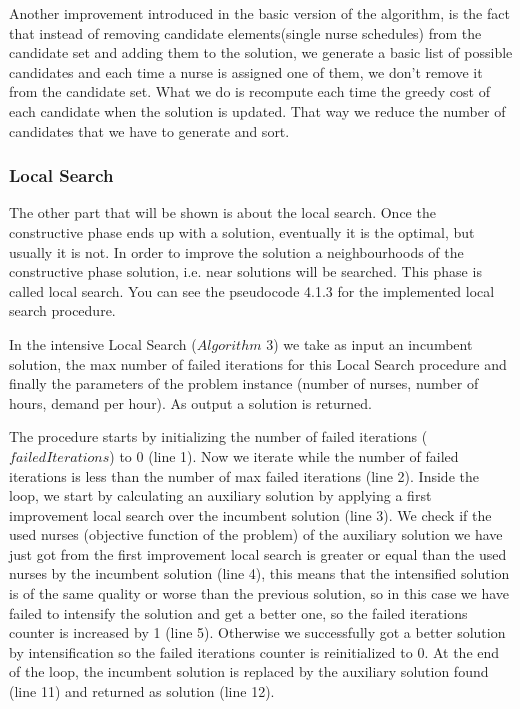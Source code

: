 Another improvement introduced in the basic version of the algorithm, is the fact that instead of removing candidate elements(single nurse schedules) from the candidate set and adding them to the solution, we generate a basic list of possible candidates and each time a nurse is assigned one of them, we don't remove it from the candidate set. What we do is recompute each time the greedy cost of each candidate when the solution is updated. That way we reduce the number of candidates that we have to generate and sort.



\subsubsection{Local Search}

The other part that will be shown is about the local search. Once the constructive phase ends up with a solution, eventually it is the optimal, but usually it is not. In order to improve the solution a neighbourhoods of the constructive phase solution, i.e. near solutions will be searched. This phase is called local search. You can see the pseudocode 4.1.3 for the implemented local search procedure.

In the intensive Local Search ($Algorithm$ $3$) we take as input an incumbent solution, the max number of failed iterations for this Local Search procedure and finally the parameters of the problem instance (number of nurses, number of hours, demand per hour). As output a solution is returned.

The procedure starts by initializing the number of failed iterations ($failedIterations$) to 0 (line 1). Now we iterate while the number of failed iterations is less than the number of max failed iterations (line 2). Inside the loop, we start by calculating an auxiliary solution by applying a first improvement local search over the incumbent solution (line 3). We check if the used nurses (objective function of the problem) of the auxiliary solution we have just got from the first improvement local search is greater or equal than the  used nurses by the incumbent solution (line 4), this means that the intensified solution is of the same quality or worse than the previous solution, so in this case we have failed to intensify the solution and get a better one, so the failed iterations counter is increased by 1 (line 5). Otherwise we successfully got a better solution by intensification so the failed iterations counter is reinitialized to 0. At the end of the loop, the incumbent solution is replaced by the auxiliary solution found (line 11) and returned as solution (line 12).

